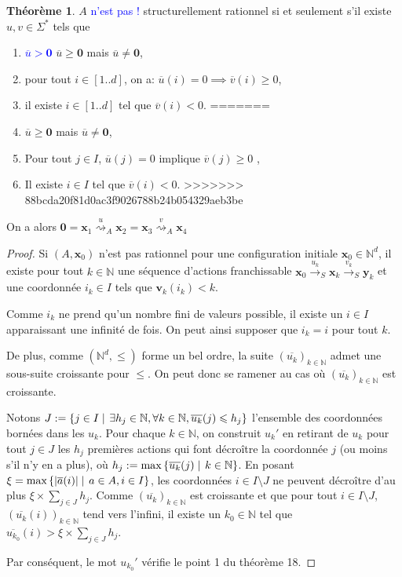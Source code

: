 \documentclass[a4paper,final]{article}
\theoremstyle{definition}
\newtheorem{Theorem}{Théorème}
\let\leq\leqslant
\let\geq\geqslant
\newcommand{\alain}[1]{\textcolor{blue}{#1}}
\newcommand{\set}[2]{\left\{#1\mathrel{\left|\vphantom{#1}\vphantom{#2}\right.}#2\right\}}
\newcommand{\abs}[1]{\ensuremath{\displaystyle\left\lvert #1 \right\rvert}}
\newcommand{\N}{\ensuremath{\mathbb{N}}}
\newcommand{\trans}[2]{\ensuremath{\stackrel{#1}{\longrightarrow}_{#2}}}
\newcommand{\transZ}[2]{\ensuremath{\stackrel{#1}{\rightsquigarrow}_{#2}}}
\newcommand{\vect}[1]{\ensuremath{\mathbf{#1}}}
\newcommand{\xinit}{\ensuremath{\vect{x}_\text{init}}}
\newcommand{\valeur}[1]{\ensuremath{\overline{#1}}}
\begin{document}
\begin{Theorem}
\xout{$S=(A,\xinit)$} $A$ \alain{n'est pas !} structurellement rationnel si et seulement s'il existe $u,v\in \Sigma^*$ tels que 
\begin{enumerate}
<<<<<<< HEAD
    \item  \alain{$\valeur{u} > \vect{0}$} 
$\valeur{u} \geq \vect{0}$ mais $\valeur{u} \neq \vect{0}$,
    \item pour tout $i \in [1..d]$, on a: $\valeur{u}(i)=0 \implies \valeur{v}(i) \geq 0$,
    \item il existe $i \in [1..d]$ tel que $\valeur{v}(i) < 0$.
=======
    \item $\valeur{u} \geq \vect{0}$ mais $\valeur{u} \neq \vect{0}$,
    \item Pour tout $j \in I$, $\valeur{u}(j)=0$ implique $\valeur{v}(j) \geq 0$ ,
    \item Il existe $i\in I$ tel que $\valeur{v}(i) < 0$.
>>>>>>> 88bcda20f81d0ac3f9026788b24b054329aeb3be
\end{enumerate}
\end{Theorem}

On a alors $\vect{0} = \vect{x}_1 \transZ{u}{A} \vect{x}_2 = \vect{x}_3 \transZ{v}{A} \vect{x}_4$

\begin{proof}
Si $(A,\vect{x}_0)$ n'est pas rationnel pour une configuration initiale $\vect{x}_0 \in\N^d$, il existe pour tout $k\in\N$ une séquence d'actions franchissable 
$\vect{x}_0 \trans{u_k}{S} \vect{x}_k \trans{v_k}{S} \vect{y}_k$
et une coordonnée $i_k \in I$ tels que $\vect{v}_k(i_k) < k$.

Comme $i_k$ ne prend qu'un nombre fini de valeurs possible, il existe un $i\in I$ apparaissant une infinité de fois.
On peut ainsi supposer que $i_k = i$ pour tout $k$.

De plus, comme $(\N^d,\leq)$ forme un bel ordre, la suite $(\valeur{u_k})_{k\in\N}$ admet une sous-suite croissante pour $\leq$.
On peut donc se ramener au cas où $(\valeur{u_k})_{k\in\N}$ est croissante.

Notons $J := \set{j\in I}{\exists h_j\in\N, \forall k\in\N, \valeur{u_k}(j) \leq h_j}$ l'ensemble des coordonnées bornées dans les $u_k$.
Pour chaque $k\in\N$, on construit $u_k'$ en retirant de $u_k$ pour tout $j\in J$ les $h_j$ premières actions qui font décroître la coordonnée $j$ (ou moins s'il n'y en a plus), où $h_j := \max \set{\valeur{u_k}(j)}{k\in\N}$.
En posant $\xi = \text{max}\set{\abs{\valeur{a}(i)}} {a\in A,i\in I}$, les coordonnées $i\in I\setminus J$ ne peuvent décroître d'au plus $\xi \times \sum_{j\in J} h_j$.
Comme $(\valeur{u_k})_{k\in\N}$ est croissante et que pour tout $i\in I\setminus J$, $(\valeur{u_k}(i))_{k\in\N}$ tend vers l'infini, il existe un $k_0\in\N$ tel que $\valeur{u_{k_0}}(i) > \xi \times \sum_{j\in J} h_j$.

Par conséquent, le mot $u_{k_0}'$ vérifie le point 1 du théorème 18.
\end{proof}
\end{document}
